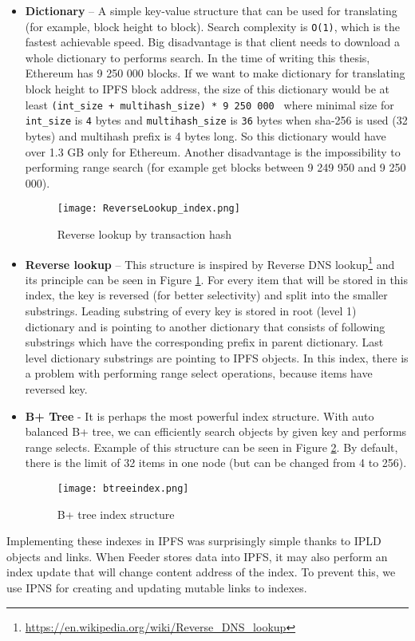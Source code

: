 \begin{itemize}
    \item \textbf{Dictionary} -- A simple key-value structure that can be used for translating (for example, block height to block). Search complexity is \texttt{O(1)}, which is the fastest achievable speed. Big disadvantage is that client needs to download a whole dictionary to performs search. In the time of writing this thesis, Ethereum has 9 250 000 blocks. If we want to make dictionary for translating block height to IPFS block address, the size of this dictionary would be at least \texttt{(int\_size + multihash\_size) * 9 250 000 } where minimal size for \texttt{int\_size} is \texttt{4} bytes and \texttt{multihash\_size} is \texttt{36} bytes when sha-256 is used (32 bytes) and multihash prefix is 4 bytes long. So this dictionary would have over 1.3 GB only for Ethereum. Another disadvantage is the impossibility to performing range search (for example get blocks between 9 249 950 and 9 250 000).

    \begin{figure}[h]
        \centering
        \texttt{[image: ReverseLookup\_index.png]}
        \caption{Reverse lookup by transaction hash}
        \label{reverseLookupIndex}
    \end{figure}

    \item \textbf{Reverse lookup} -- This structure is inspired by Reverse DNS lookup\footnote{\url{https://en.wikipedia.org/wiki/Reverse_DNS_lookup}} and its principle can be seen in Figure \ref{reverseLookupIndex}. For every item that will be stored in this index, the key is reversed (for better selectivity) and split into the smaller substrings. Leading substring of every key is stored in root (level 1) dictionary and is pointing to another dictionary that consists of following substrings which have the corresponding prefix in parent dictionary. Last level dictionary substrings are pointing to IPFS objects. In this index, there is a problem with performing range select operations, because items have reversed key.
    
    \item \textbf{B+ Tree} - It is perhaps the most powerful index structure. With auto balanced B+ tree, we can efficiently search objects by given key and performs range selects. Example of this structure can be seen in Figure \ref{btreeindex}. By default, there is the limit of 32 items in one node (but can be changed from 4 to 256). 
    


    \begin{figure}[h]
        \centering
        \texttt{[image: btreeindex.png]}
        \caption{B+ tree index structure}
        \label{btreeindex}
    \end{figure}

\end{itemize}
Implementing these indexes in IPFS was surprisingly simple thanks to IPLD objects and links. When Feeder stores data into IPFS, it may also perform an index update that will change content address of the index. To prevent this, we use IPNS for creating and updating mutable links to indexes.



